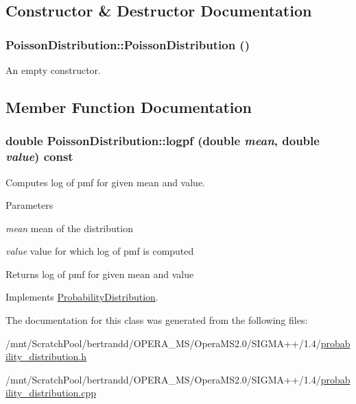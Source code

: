 \subsection{Constructor \& Destructor Documentation}
\hypertarget{classPoissonDistribution_a9dae9524ab51e52edd25a125d63d7376}{
\subsubsection[{PoissonDistribution}]{\setlength{\rightskip}{0pt plus 5cm}PoissonDistribution::PoissonDistribution ()}}
\label{classPoissonDistribution_a9dae9524ab51e52edd25a125d63d7376}
An empty constructor. 

\subsection{Member Function Documentation}
\hypertarget{classPoissonDistribution_ae4bb9a4af35078b03fdf3778644d529d}{
\subsubsection[{logpf}]{\setlength{\rightskip}{0pt plus 5cm}double PoissonDistribution::logpf (double {\em mean}, \/  double {\em value}) const}}
\label{classPoissonDistribution_ae4bb9a4af35078b03fdf3778644d529d}


Computes log of pmf for given mean and value. 
\begin{DoxyParams}{Parameters}
\item[{\em mean}]mean of the distribution \item[{\em value}]value for which log of pmf is computed \end{DoxyParams}
\begin{DoxyReturn}{Returns}
log of pmf for given mean and value 
\end{DoxyReturn}


Implements \hyperlink{classProbabilityDistribution_a9ac2ee460523d2e8f77e7541c9d40ef7}{ProbabilityDistribution}.

The documentation for this class was generated from the following files:\begin{DoxyCompactItemize}
\item 
/mnt/ScratchPool/bertrandd/OPERA\_\-MS/OperaMS2.0/SIGMA++/1.4/\hyperlink{probability__distribution_8h}{probability\_\-distribution.h}\item 
/mnt/ScratchPool/bertrandd/OPERA\_\-MS/OperaMS2.0/SIGMA++/1.4/\hyperlink{probability__distribution_8cpp}{probability\_\-distribution.cpp}\end{DoxyCompactItemize}
